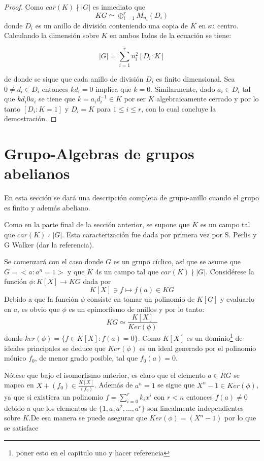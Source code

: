 \begin{proof}
Como $car(K) \nmid |G|$ es inmediato que 
\[KG \simeq \oplus_{i=1}^{r} M_{n_i}(D_i)\]
donde $D_i$ es un anillo de división conteniendo una copia de $K$ en su centro. Calculando la dimensión sobre $K$ en ambos lados de la ecuación se tiene:

\[ |G| = \sum_{i=1}^{r} n_i^2[D_i:K]\]

de donde se sique que cada anillo de división $D_i$ es finito dimensional. Sea $0 \neq d_i \in D_i$ entonces $kd_i = 0$ implica que $k=0$. Similarmente, dado $a_i \in D_i$ tal que $kd_i 0 a_i$ se tiene que $k = a_id_i^{-1} \in K$ por ser $K$ algebraicamente cerrado y por lo tanto $[D_i:K = 1]$ y $D_i = K$ para $1 \leq i \leq r$, con lo cual concluye la demostración. 
\end{proof}

\section{Grupo-Algebras de grupos abelianos}

 En esta sección se dará una descripción completa de grupo-anillo cuando el grupo es finito y además abeliano. 
 
 Como en la parte final de la sección anterior, se supone que $K$ es un campo tal que $car(K) \nmid |G|$. Esta caracterización fue dada por primera vez por S. Perlis y G Walker (dar la referencia). 
 
 Se comenzará con el caso donde $G$ es un grupo cíclico, así que se asume que $G = <a \colon a^n = 1>$ y que $K$ 4s un campo tal que $car(K) \nmid |G|$. Considérese la función $\phi \colon K[X] \to KG$ dada por 
 \[K[X] \ni f \mapsto f(a) \in KG \]
 Debido a que la función $\phi$ consiste en tomar un polinomio de $K[G]$ y evaluarlo en $a$, es obvio que $\phi$ es un epimorfismo de anillos y por lo tanto:
 \[KG \simeq \frac{K[X]}{Ker(\phi)}\]
donde $ker(\phi) = \{f \in K[X] : f(a) = 0 \}$. Como $K[X]$ es un dominio\footnote{poner esto en el capitulo uno y hacer referencia} de ideales principales se deduce que $Ker(\phi)$ es un ideal generado por el polinomio mónico $f_0$, de menor grado posible, tal que $f_0(a) = 0$.

Nótese que bajo el isomorfismo anterior, es claro que el elemento $a \in RG$ se mapea en $X + (f_0) \in \frac{K[X]}{(f_0)}$. Además de $a^n = 1$ se sigue que $X^n -1 \in Ker(\phi)$, ya que si existiera un polinomio $f = \sum_{i=0}^{r}k_ix^i$ con $r < n$ entonces $f(a) \neq 0$ debido a que los elementos de $\{1,a,a^2, \dots, a^r \}$ son linealmente independientes sobre $K$.De esa manera se puede asegurar que $Ker(\phi) = (X^n -1)$ por lo que se satisface 

